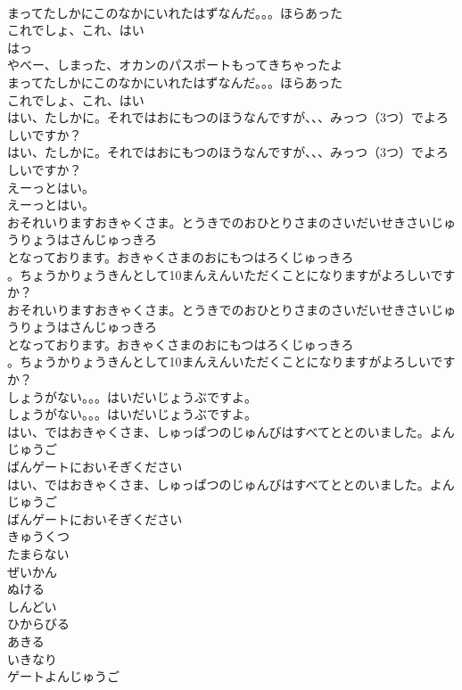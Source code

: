 \documentclass[8pt]{extreport}
\begin{document}
\begin{CJK}{UTF8}{min}
\\	まってたしかにこのなかにいれたはずなんだ。。。ほらあった
\\	これでしょ、これ、はい
\\	はっ
\\	やべー、しまった、オカンのパスポートもってきちゃったよ
\\	まってたしかにこのなかにいれたはずなんだ。。。ほらあった
\\	これでしょ、これ、はい
\\	はい、たしかに。それではおにもつのほうなんですが、、、みっつ（3つ）でよろしいですか？
\\	はい、たしかに。それではおにもつのほうなんですが、、、みっつ（3つ）でよろしいですか？
\\	えーっとはい。
\\	えーっとはい。
\\	おそれいりますおきゃくさま。とうきでのおひとりさまのさいだいせきさいじゅうりょうはさんじゅっきろ
\\	となっております。おきゃくさまのおにもつはろくじゅっきろ
\\	。ちょうかりょうきんとして10まんえんいただくことになりますがよろしいですか？
\\	おそれいりますおきゃくさま。とうきでのおひとりさまのさいだいせきさいじゅうりょうはさんじゅっきろ
\\	となっております。おきゃくさまのおにもつはろくじゅっきろ
\\	。ちょうかりょうきんとして10まんえんいただくことになりますがよろしいですか？
\\	しょうがない。。。はいだいじょうぶですよ。
\\	しょうがない。。。はいだいじょうぶですよ。
\\	はい、ではおきゃくさま、しゅっぱつのじゅんびはすべてととのいました。よんじゅうご
\\	ばんゲートにおいそぎください
\\	はい、ではおきゃくさま、しゅっぱつのじゅんびはすべてととのいました。よんじゅうご
\\	ばんゲートにおいそぎください
\\	きゅうくつ
\\	たまらない
\\	ぜいかん
\\	ぬける
\\	しんどい
\\	ひからびる
\\	あきる
\\	いきなり
\\	ゲートよんじゅうご

\end{CJK}
\end{document}
